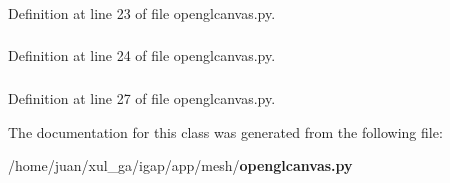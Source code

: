 \subsubsection{}\label{classapp_1_1mesh_1_1openglcanvas_1_1IGAGLCanvas_b5a8104d85b4f3e6c6d3519910051c99}




Definition at line 23 of file openglcanvas.py.
\subsubsection{}\label{classapp_1_1mesh_1_1openglcanvas_1_1IGAGLCanvas_764589630b015e565bcb9f6adf461987}




Definition at line 24 of file openglcanvas.py.
\subsubsection{}\label{classapp_1_1mesh_1_1openglcanvas_1_1IGAGLCanvas_0698e3dc629f9e8dfeb0f7483d432a74}




Definition at line 27 of file openglcanvas.py.

The documentation for this class was generated from the following file:\begin{CompactItemize}
\item 
/home/juan/xul\_\-ga/igap/app/mesh/{\bf openglcanvas.py}\end{CompactItemize}
